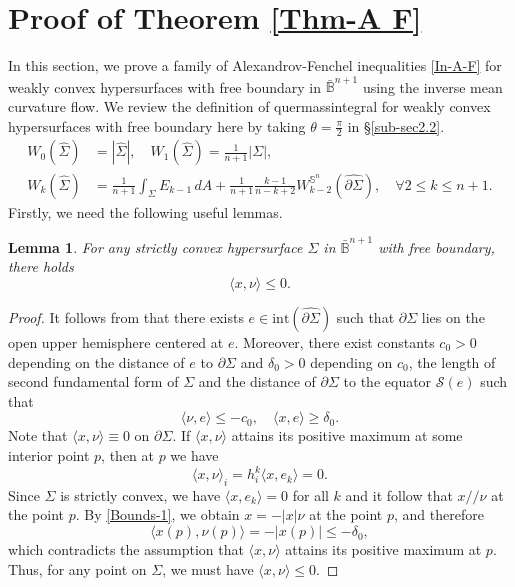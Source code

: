 \documentclass[11pt,reqno]{amsart}
\newtheorem{lem}[thm]{Lemma}
\theoremstyle{definition}
\theoremstyle{remark}
\numberwithin{equation}{section}
\renewcommand{\(}{\left(}
\renewcommand{\)}{\right)}
\renewcommand{\-}{\overline}
\begin{document}
\section{Proof of Theorem \ref{Thm-A F}}\label{Sec-A F}
In this section, we prove a family of Alexandrov-Fenchel inequalities \eqref{In-A-F} for weakly convex hypersurfaces with free boundary in $\bar{\mathbb{B}}^{n+1}$ using the inverse mean curvature flow. We review the definition of quermassintegral for weakly convex hypersurfaces with free boundary here by taking $\theta=\frac{\pi}{2}$ in \S\ref{sub-sec2.2}.
\begin{align}
	W_0(\widehat{\Sigma})&=|\widehat{\Sigma}|,\quad W_1(\widehat{\Sigma})=\frac{1}{n+1}|\Sigma|,\label{Defn-W01}\\
	W_k(\widehat{\Sigma})&=\frac{1}{n+1}\int_{\Sigma}{E_{k-1}}\,dA+\frac{1}{n+1}\frac{k-1}{n-k+2}W_{k-2}^{\mathbb{S}^n}(\widehat{\partial\Sigma}),\quad \forall 2\leq k\leq n+1.\label{Defn-Wk}
\end{align}
Firstly, we need the following useful lemmas.
\begin{lem}\label{Lem-5.1}
	For any strictly convex hypersurface $\Sigma$ in $\bar{\mathbb{B}}^{n+1}$ with free boundary, there holds
	\begin{equation}\label{In-xnu}
		\langle x,\nu\rangle\leq 0.
	\end{equation}
\end{lem}
\begin{proof}
It follows from \cite[Lemma 11, Lemma 12]{Lambert-Scheuer2016} that there exists $e\in\mathrm{int}(\widehat{\partial\Sigma})$ such that $\partial\Sigma$ lies on the open upper hemisphere centered at $e$. Moreover, there exist constants $c_0>0$ depending on the distance of $e$ to $\partial\Sigma$ and $\delta_0>0$ depending on $c_0$, the length of second fundamental form of $\Sigma$ and the distance of $\partial\Sigma$ to the equator $\mathcal{S}(e)$ such that
\begin{equation}\label{Bounds-1}
	\langle\nu,e\rangle\leq -c_0,\quad \langle x,e\rangle\geq \delta_0.
\end{equation}
Note that $\langle x,\nu\rangle\equiv 0$ on $\partial\Sigma$. If $\langle x,\nu\rangle$ attains its positive maximum at some interior point $p$, then at  $p$ we have
\begin{equation}
	\langle x,\nu\rangle_i=h_i^k\langle x,e_k\rangle=0.
\end{equation}
Since $\Sigma$ is strictly convex, we have $\langle x,e_k\rangle=0$ for all $k$ and it follow that $x//\nu$ at the point $p$. By \eqref{Bounds-1}, we obtain $x=-|x|\nu$ at the point $p$, and therefore
\begin{equation}
	\langle x(p),\nu(p)\rangle=-|x(p)|\leq -\delta_0,
\end{equation}
which contradicts the assumption that $\langle x,\nu\rangle$ attains its positive maximum at $p$. Thus, for any point on $\Sigma$, we must have $\langle x,\nu\rangle\leq 0$.
\end{proof}
\end{document}
